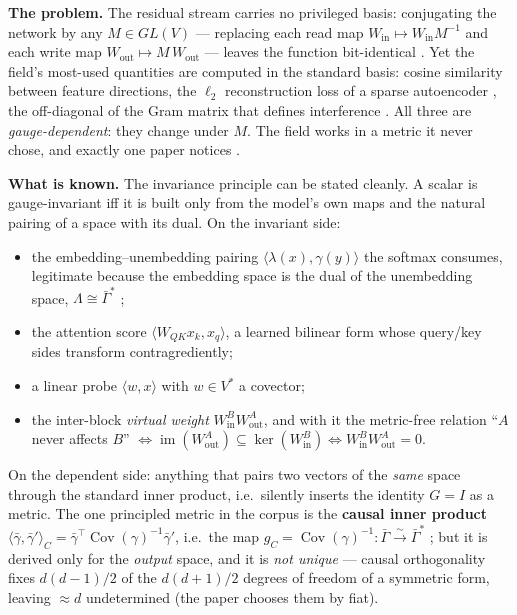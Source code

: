 \textbf{The problem.} The residual stream carries no privileged basis: conjugating the network by
any $M\in GL(V)$ --- replacing each read map $W_{\mathrm{in}}\mapsto W_{\mathrm{in}}M^{-1}$ and
each write map $W_{\mathrm{out}}\mapsto M\,W_{\mathrm{out}}$ --- leaves the function bit-identical
\parencite{framework,privileged-bases-residual-stream}. Yet the field's most-used quantities are
computed in the standard basis: cosine similarity between feature directions, the $\ell_2$
reconstruction loss of a sparse autoencoder \parencite{towards-monosemanticity,scaling-monosemanticity},
the off-diagonal of the Gram matrix that defines interference \parencite{toy-models-superposition}.
All three are \emph{gauge-dependent}: they change under $M$. The field works in a metric it never
chose, and exactly one paper notices \parencite{linear-representation-hypothesis-geometry}.

\textbf{What is known.} The invariance principle can be stated cleanly. A scalar is gauge-invariant
iff it is built only from the model's own maps and the natural pairing of a space with its dual.
On the invariant side:
\begin{itemize}
\item the embedding--unembedding pairing $\langle\lambda(x),\gamma(y)\rangle$ the softmax consumes,
  legitimate because the embedding space is the dual of the unembedding space,
  $\Lambda\cong\bar\Gamma^{*}$ \parencite{linear-representation-hypothesis-geometry};
\item the attention score $\langle W_{QK}x_k,x_q\rangle$, a learned bilinear form whose query/key
  sides transform contragrediently;
\item a linear probe $\langle w,x\rangle$ with $w\in V^{*}$ a covector;
\item the inter-block \emph{virtual weight} $W_{\mathrm{in}}^{B}W_{\mathrm{out}}^{A}$, and with it
  the metric-free relation ``$A$ never affects $B$'' $\iff \operatorname{im}(W_{\mathrm{out}}^{A})
  \subseteq \ker(W_{\mathrm{in}}^{B})\iff W_{\mathrm{in}}^{B}W_{\mathrm{out}}^{A}=0$.
\end{itemize}
On the dependent side: anything that pairs two vectors of the \emph{same} space through the
standard inner product, i.e.\ silently inserts the identity $G=I$ as a metric. The one principled
metric in the corpus is the \textbf{causal inner product}
$\langle\bar\gamma,\bar\gamma'\rangle_C=\bar\gamma^{\top}\operatorname{Cov}(\gamma)^{-1}\bar\gamma'$,
i.e.\ the map $g_C=\operatorname{Cov}(\gamma)^{-1}:\bar\Gamma\xrightarrow{\sim}\bar\Gamma^{*}$
\parencite{linear-representation-hypothesis-geometry}; but it is derived only for the
\emph{output} space, and it is \emph{not unique} --- causal orthogonality fixes $d(d-1)/2$ of the
$d(d+1)/2$ degrees of freedom of a symmetric form, leaving $\approx d$ undetermined (the paper
chooses them by fiat).

